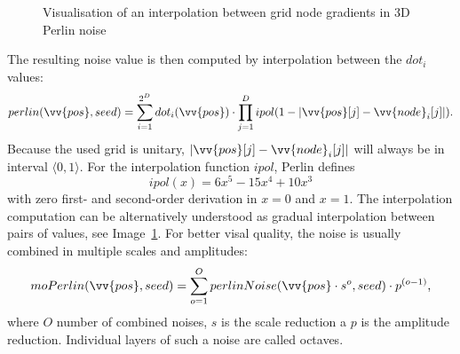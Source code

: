 \begin{figure}[H]
\begin{minipage}[t]{0.48\textwidth}
		\caption{Visualisation of an interpolation between grid node gradients in 3D Perlin noise}
		\label{perlinInterpolation}
	\end{minipage}	
\end{figure}\vspace{5mm}

The resulting noise value is then computed by interpolation between the $dot_i$ values:
\begin{equation}
	perlin(\vv{pos}, seed) = \sum_{i=1}^{2^D} dot_i(\vv{pos}) \cdot \prod_{j=1}^{D} ipol(1 - |\vv{pos}[j] - \vv{node}_i[j]|) \text{.}
\end{equation}
Because the used grid is unitary, $|\vv{pos}[j] - \vv{node}_i[j]|$ will always be in interval $\langle 0, 1 \rangle$. For the interpolation function $ipol$, Perlin \cite{PerlinKen2002In} defines
\begin{equation}
	ipol(x) = 6x^5 - 15x^4 + 10x^3
\end{equation}
with zero first- and second-order derivation in $x = 0$ and $x = 1$. The interpolation computation can be alternatively understood as gradual interpolation between pairs of values, see Image~\ref{perlinInterpolation}. For better visal quality, the noise is usually combined in multiple scales and amplitudes:
\begin{equation}
	moPerlin(\vv{pos}, seed) = \sum_{o = 1}^{O} perlinNoise(\vv{pos} \cdot s^o, seed) \cdot p^{(o-1)} \text{,}
\end{equation}
where $O$ number of combined noises, $s$ is the scale reduction a $p$ is the amplitude reduction. Individual layers of such a noise are called octaves.

